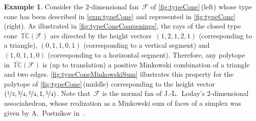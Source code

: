 \documentclass{amsart}
\theoremstyle{definition}
\newtheorem{example}[theorem]{Example}
\newcommand{\Fan}{\mathcal{F}} %
\newcommand{\ctypeCone}{\overline{\mathbb{TC}}} %
\begin{document}
\begin{example}
\label{exm:typeConeMinkowskiSum}
\enlargethispage{.4cm}
Consider the $2$-dimensional fan~$\Fan$ of \cref{fig:typeCone}\,(left) whose type cone has been described in \cref{exm:typeCone} and represented in \cref{fig:typeCone}\,(right).
As illustrated in \cref{fig:typeConeCoarsenings}, the rays of the closed type cone~$\ctypeCone(\Fan)$ are directed by the height vectors~$(1,2,1,2,1)$ (corresponding to a triangle), $(0,1,1,0,1)$ (corresponding to a vertical segment) and~$(1,0,1,1,0)$ (corresponding to a horizontal segment).
Therefore, any polytope in~$\ctypeCone(\Fan)$ is (up to translation) a positive Minkowski combination of a triangle and two edges.
\cref{fig:typeConeMinkowskiSum} illustrates this property for the polytope of \cref{fig:typeCone}\,(middle) corresponding to the height vector~$(\nicefrac{1}{2}, \nicefrac{3}{4}, \nicefrac{5}{4}, 1, \nicefrac{5}{4})$.
Note that~$\Fan$ is the normal fan of J.-L.~Loday's $2$-dimensional associahedron, whose realization as a Minkowski sum of faces of a simplex was given by A.~Postnikov in~\cite{Postnikov}.


\end{example}
\end{document}
